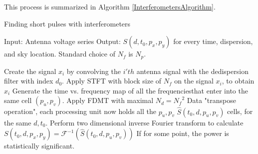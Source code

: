 \documentclass[iop]{emulateapj}
\begin{document}
This process is summarized in Algorithm \ref{InterferometersAlgorithm}.
\begin{algorithm}[H]
\caption{Finding short pulses with interferometers}
\label{InterferometersAlgorithm}
Input: Antenna voltage series
Output: $S(d,t_0,p_x,p_y)$ for every time, dispersion, and sky location.
Standard choice of ${N_{f}}$ is ${N_{p}}$.
\begin{algorithmic}[1]
  

\STATE Create the signal $x_i$ by convolving the $i'th$ antenna signal with the dedispersion filter with index $d_0$.
\STATE Apply STFT with block size of ${N_{f}}$ on the signal $x_i$, to obtain $\hat{x}_i$
\ENDFOR
{}
\STATE Generate the time vs. frequency map of all the frequencies\footnotemark that enter into the same cell $(p_u,p_v)$.
\STATE Apply FDMT with maximal ${N_{d}}={N_{f}}^2$
\ENDFOR
\STATE Data "transpose operation", each processing unit now holds all the $p_u,p_v$ $\hat{S}(t_0,d,p_u,p_v)$ cells, for the same $d,t_0$. 
\STATE Perform two dimensional inverse Fourier transform to calculate $S(t_0,d,p_x,p_y) = \mathcal{F}^{-1}(\hat{S}(t_0,d,p_u,p_v))$
\STATE If for some point, the power is statistically significant. 
\ENDFOR
\ENDFOR

\ENDFOR 
\end{algorithmic}
\end{algorithm}
\end{document}
